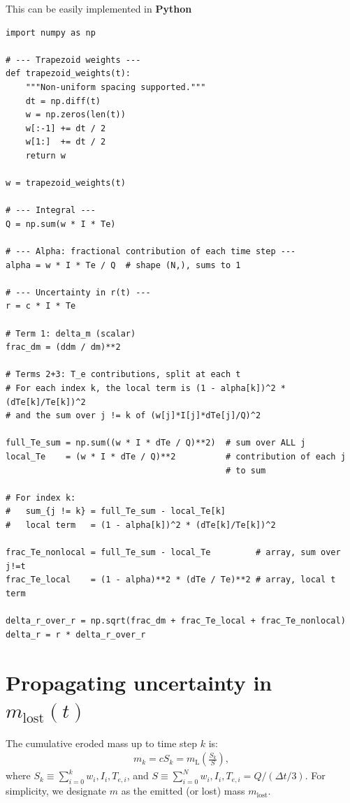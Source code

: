 \documentclass[11pt,twoside]{article}
\begin{document}
This can be easily implemented in \textbf{Python}
\begin{lstlisting}[caption={Sample implementation of $\delta r_k$ in Python}]
import numpy as np

# --- Trapezoid weights ---
def trapezoid_weights(t):
    """Non-uniform spacing supported."""
    dt = np.diff(t)
    w = np.zeros(len(t))
    w[:-1] += dt / 2
    w[1:]  += dt / 2
    return w

w = trapezoid_weights(t)

# --- Integral ---
Q = np.sum(w * I * Te)

# --- Alpha: fractional contribution of each time step ---
alpha = w * I * Te / Q  # shape (N,), sums to 1

# --- Uncertainty in r(t) ---
r = c * I * Te

# Term 1: delta_m (scalar)
frac_dm = (ddm / dm)**2

# Terms 2+3: T_e contributions, split at each t
# For each index k, the local term is (1 - alpha[k])^2 * (dTe[k]/Te[k])^2
# and the sum over j != k of (w[j]*I[j]*dTe[j]/Q)^2

full_Te_sum = np.sum((w * I * dTe / Q)**2)  # sum over ALL j
local_Te    = (w * I * dTe / Q)**2          # contribution of each j 
                                            # to sum

# For index k:
#   sum_{j != k} = full_Te_sum - local_Te[k]
#   local term   = (1 - alpha[k])^2 * (dTe[k]/Te[k])^2

frac_Te_nonlocal = full_Te_sum - local_Te         # array, sum over j!=t
frac_Te_local    = (1 - alpha)**2 * (dTe / Te)**2 # array, local t term

delta_r_over_r = np.sqrt(frac_dm + frac_Te_local + frac_Te_nonlocal)
delta_r = r * delta_r_over_r
\end{lstlisting}

\section{Propagating uncertainty in $m_{\mathrm{lost}}(t)$}
The cumulative eroded mass up to time step $k$ is:
\begin{align}
    m_k = c S_k = m_{\mathrm{L}}\left(\frac{S_k}{S}\right),
    \label{eq:mass_loss_equation}
\end{align}
where $S_k \equiv \sum_{i=0}^k w_i, I_i, T_{e,i}$, and $S \equiv \sum_{i=0}^N w_i, I_i, T_{e,i} = Q / (\Delta t / 3)$. For simplicity, we designate $m$ as the emitted (or lost) mass $m_{\mathrm{lost}}$.
\end{document}

